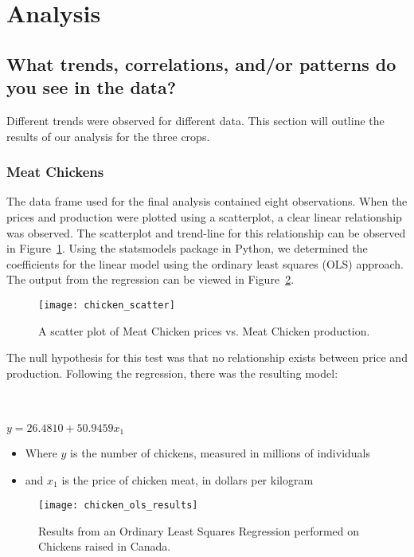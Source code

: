 \section{Analysis}

\subsection{What trends, correlations, and/or patterns do you see in the data?}

Different trends were observed for different data. This section will outline the results of our analysis for the three crops.

\subsubsection{Meat Chickens}

The data frame used for the final analysis contained eight observations.
When the prices and production were plotted using a scatterplot, a clear linear relationship was observed.
The scatterplot and trend-line for this relationship can be observed in Figure~\ref{fig:chicken_scatter}.
Using the statsmodels package in Python, we determined the coefficients for the linear model using the ordinary least squares (OLS) approach.
The output from the regression can be viewed in Figure~\ref{fig:chicken_ols}.

\begin{figure}
    \texttt{[image: chicken\_scatter]}
    \caption{A scatter plot of Meat Chicken prices vs. Meat Chicken production.}
    \label{fig:chicken_scatter}
\end{figure}

The null hypothesis for this test was that no relationship exists between price and production.
Following the regression, there was the resulting model:

\\~\\

\tabto{5cm} $y = 26.4810 + 50.9459x_1$


\begin{itemize}
    \item Where $y$ is the number of chickens, measured in millions of individuals
    \item and $x_1$ is the price of chicken meat, in dollars per kilogram
\end{itemize}

\begin{figure}
    \texttt{[image: chicken\_ols\_results]}
    \caption{Results from an Ordinary Least Squares Regression performed on Chickens raised in Canada.}
    \label{fig:chicken_ols}
\end{figure}

